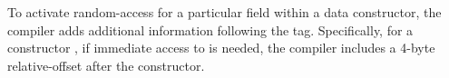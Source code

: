To activate random-access for a particular field within a data constructor, the compiler
adds additional information following the tag.  Specifically, for a constructor
, if immediate access to  is needed, the compiler includes a 4-byte
relative-offset after the constructor.
%


%

